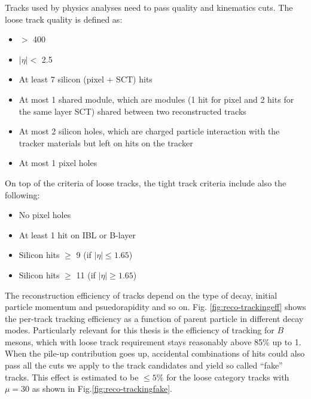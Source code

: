 Tracks used by physics analyses need to pass quality and kinematics cuts. The loose track quality\cite{ATL-PHYS-PUB-2015-018} is defined as:

\begin{itemize}
\item \pT $>$ 400 \mev
\item $|\eta| < $ 2.5
\item At least 7 silicon (pixel + SCT) hits
\item At most 1 shared module, which are modules (1 hit for pixel and 2 hits for the same layer SCT) shared between two reconstructed tracks
\item At most 2 silicon holes, which are charged particle interaction with the tracker materials but left on hits on the tracker 
\item At most 1 pixel holes
\end{itemize}

On top of the criteria of loose tracks, the tight track criteria\cite{ATL-PHYS-PUB-2015-018} include also the following:

\begin{itemize}
\item No pixel holes
\item At least 1 hit on IBL or B-layer
\item Silicon hits $\geq$ 9 (if $|\eta|\leq 1.65$)
\item Silicon hits $\geq$ 11 (if $|\eta|\geq 1.65$)
\end{itemize}

The reconstruction efficiency of tracks depend on the type of decay, initial particle momentum and psuedorapidity and so on. Fig. \ref{fig:reco-trackingeff} shows the per-track tracking efficiency as a function of parent particle \pt in different decay modes. Particularly relevant for this thesis is the efficiency of tracking for $B$ mesons, which with loose track requirement stays reasonably above 85\% up to 1\TeV. When the pile-up contribution goes up, accidental combinations of hits could also pass all the cuts we apply to the track candidates and yield so called ``fake'' tracks. This effect is estimated to be $\leq 5\%$ for the loose category tracks with $\mu = 30$ as shown in Fig.\ref{fig:reco-trackingfake}.


